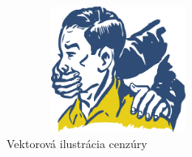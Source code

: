 \documentclass{article}
\begin{document}
\begin{figure}[htbp]
    \begin{center}
        \includegraphics[width=0.65\textwidth, height=155px]{censored-nospeaking.eps}
    \end{center}
    \caption{Vektorová ilustrácia cenzúry}
    \label{censored-nospeaking}
\end{figure}

\printbibliography[heading=bibintoc]
\begingroup
\let\clearpage\relax
\printindex
\endgroup
\end{document}

